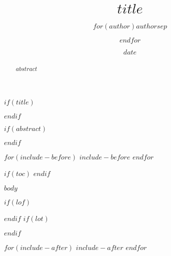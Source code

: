 \documentclass[$if(lang)$$lang$,$endif$$if(citecolor)$$citecolor$,$endif$$if(urlcolor)$$urlcolor$,$endif$$if(linkcolor)$$linkcolor$,$endif$$for(classoption)$$classoption$$sep$,$endfor$]{tufte-ebook}
\title{$title$}
\author{$for(author)$$author$$sep$ \and $endfor$}
\date{$date$}
\begin{document}
$if(title)$
\maketitle
$endif$

$if(abstract)$
\begin{abstract}
\noindent $abstract$
\end{abstract}
$endif$

$for(include-before)$
$include-before$
$endfor$

$if(toc)$
\setcounter{tocdepth}{$toc-depth$}
\tableofcontents
$endif$

$body$



\begin{fullwidth}
\begin{multicols}{2}

\backmatter
$if(lof)$
\listoffigures
$endif$
$if(lot)$
\listoftables
$endif$

\printindex

\end{multicols}
\end{fullwidth}

$for(include-after)$
$include-after$
$endfor$
\end{document}
